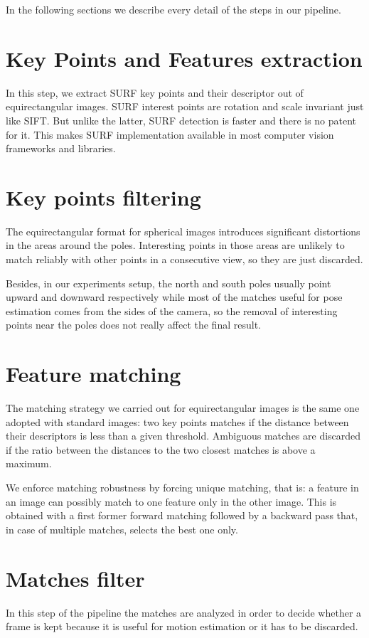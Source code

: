 In the following sections we describe every detail of the steps in our pipeline.

\section{Key Points and Features extraction}
In this step, we extract SURF key points and their descriptor out of 
equirectangular images. SURF 
interest points are rotation and scale invariant just like SIFT. But unlike 
the latter, SURF detection is faster and there is no patent for it. 
This makes SURF implementation available in most computer vision frameworks and 
libraries.

\section{Key points filtering}
The equirectangular format for spherical images introduces significant 
distortions in the areas around the poles. Interesting points in those areas 
are unlikely to match reliably with other points in a consecutive view, 
so they are just discarded.

Besides, in our experiments setup, the north and south poles usually point 
upward and downward respectively while most of the matches useful for pose 
estimation comes from the sides of the camera, so the removal of interesting 
points near the poles does not really affect the final result.

\section{Feature matching}
The matching strategy we carried out for equirectangular images is the same one 
adopted with standard images: two key points matches if the distance between 
their descriptors is less than a given threshold. Ambiguous matches 
are discarded if the ratio between the distances to the two closest matches is 
above a maximum.

We enforce matching robustness by forcing unique matching, that is: a feature 
in an image can possibly match to one feature only in the other image.
This is obtained with a first former forward matching followed by a backward 
pass that, in case of multiple matches, selects the best one only.

\section{Matches filter}
In this step of the pipeline the matches are analyzed in order to decide 
whether a frame is kept because it is useful for motion estimation or 
it has to be discarded.

